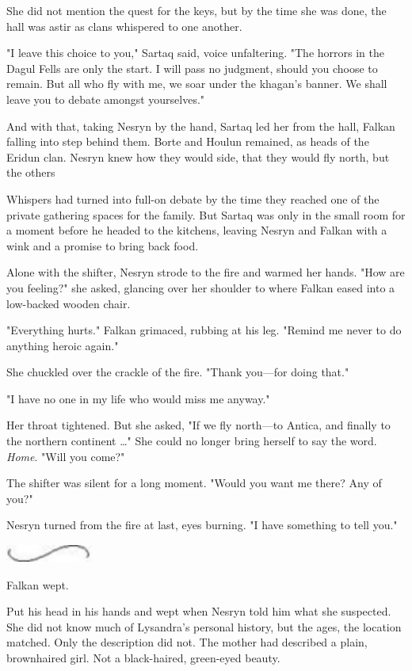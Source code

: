 She did not mention the quest for the keys, but by the time she was done, the hall was astir as clans whispered to one another.

"I leave this choice to you," Sartaq said, voice unfaltering.
"The horrors in the Dagul Fells are only the start.
I will pass no judgment, should you choose to remain.
But all who fly with me, we soar under the khagan's banner.
We shall leave you to debate amongst yourselves."

And with that, taking Nesryn by the hand, Sartaq led her from the hall, Falkan falling into step behind them.
Borte and Houlun remained, as heads of the Eridun clan.
Nesryn knew how they would side, that they would fly north, but the others 

Whispers had turned into full-on debate by the time they reached one of the private gathering spaces for the family.
But Sartaq was only in the small room for a moment before he headed to the kitchens, leaving Nesryn and Falkan with a wink and a promise to bring back food.

Alone with the shifter, Nesryn strode to the fire and warmed her hands.
"How are you feeling?"
she asked, glancing over her shoulder to where Falkan eased into a low-backed wooden chair.

"Everything hurts."
Falkan grimaced, rubbing at his leg.
"Remind me never to do anything heroic again."

She chuckled over the crackle of the fire.
"Thank you---for doing that."

"I have no one in my life who would miss me anyway."

Her throat tightened.
But she asked, "If we fly north---to Antica, and finally to the northern continent \ldots" She could no longer bring herself to say the word.
\emph{Home}.
"Will you come?"

The shifter was silent for a long moment.
"Would you want me there?
Any of you?"

Nesryn turned from the fire at last, eyes burning.
"I have something to tell you."

\begin{center}
	\includegraphics[width=1.12in,height=0.24in]{images/seperator}
\end{center}

Falkan wept.

Put his head in his hands and wept when Nesryn told him what she suspected.
She did not know much of Lysandra's personal history, but the ages, the location matched.
Only the description did not.
The mother had described a plain, brownhaired girl.
Not a black-haired, green-eyed beauty.

